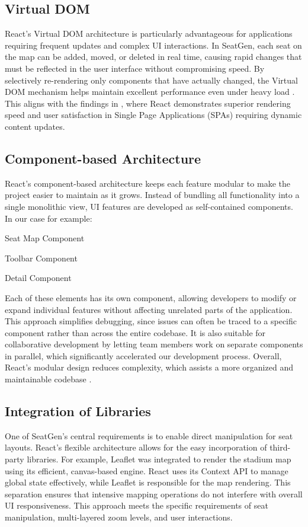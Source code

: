 \subsection{Virtual DOM}
React’s Virtual DOM architecture is particularly advantageous for applications requiring frequent updates and complex UI interactions. In SeatGen, each seat on the map can be added, moved, or deleted in real time, causing rapid changes that must be reflected in the user interface without compromising speed. By selectively re-rendering only components that have actually changed, the Virtual DOM mechanism helps maintain excellent performance even under heavy load \cite{ReactVirtualDOM}. This aligns with the findings in \cite{SPAComp}, where React demonstrates superior rendering speed and user satisfaction in Single Page Applications (SPAs) requiring dynamic content updates.

\subsection{Component-based Architecture}
React’s component-based architecture keeps each feature modular to make the project easier to maintain as it grows. Instead of bundling all functionality into a single monolithic view, UI features are developed as self-contained components. In our case for example:
\begin{compactitem}
    \item Seat Map Component
    \item Toolbar Component
    \item Detail Component
\end{compactitem}
Each of these elements has its own component, allowing developers to modify or expand individual features without affecting unrelated parts of the application. This approach simplifies debugging, since issues can often be traced to a specific component rather than across the entire codebase. It is also suitable for collaborative development by letting team members work on separate components in parallel, which significantly accelerated our development process. Overall, React’s modular design reduces complexity, which assists a more organized and maintainable codebase \cite{ReactCBA01, ReactCBA02, ReactCBA03}.

\subsection{Integration of Libraries}
One of SeatGen’s central requirements is to enable direct manipulation for seat layouts. React’s flexible architecture allows for the easy incorporation of third-party libraries. For example, Leaflet was integrated to render the stadium map using its efficient, canvas-based engine. React uses its Context API to manage global state effectively, while Leaflet is responsible for the map rendering. This separation ensures that intensive mapping operations do not interfere with overall UI responsiveness. This approach meets the specific requirements of seat manipulation, multi-layered zoom levels, and user interactions.

